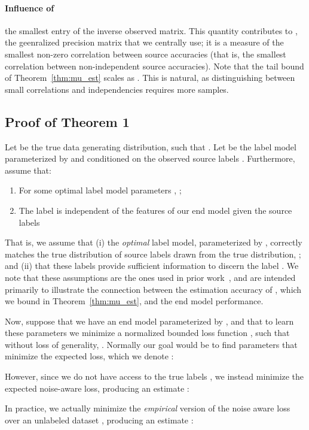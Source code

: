 \documentclass[letterpaper]{article}
\begin{document}
\begin{appendix}
\paragraph*{Influence of } the smallest entry of the inverse observed matrix. This quantity contributes to , the geenralized precision matrix that we centrally use; it is a measure of the smallest non-zero correlation between source accuracies (that is, the smallest correlation between non-independent source accuracies). Note that the tail bound of Theorem~\ref{thm:mu_est} scales as . This is natural, as distinguishing between small correlations and independencies requires more samples. 


\subsection{Proof of Theorem 1}
\label{appendix:theorem-1}

Let  be the true data generating distribution, such that .
Let  be the label model parameterized by  and conditioned on the observed source labels .
Furthermore, assume that:
\begin{enumerate}
	\item For some optimal label model parameters , ;
	\item The label  is independent of the features of our end model given the source labels 
\end{enumerate}
That is, we assume that (i) the \textit{optimal} label model, parameterized by , correctly matches the true distribution of source labels  drawn from the true distribution, ; and (ii) that these labels  provide sufficient information to discern the label .
We note that these assumptions are the ones used in prior work~\citep{ratner2016data}, and are intended primarily to illustrate the connection between the estimation accuracy of , which we bound in Theorem~\ref{thm:mu_est}, and the end model performance.

Now, suppose that we have an end model parameterized by , and that to learn these parameters we minimize a normalized bounded loss function , such that without loss of generality, .
Normally our goal would be to find parameters that minimize the expected loss, which we denote :

However, since we do not have access to the true labels , we instead minimize the expected noise-aware loss, producing an estimate :

In practice, we actually minimize the \textit{empirical} version of the noise aware loss over an unlabeled dataset , producing an estimate :


\end{appendix}
\end{document}
